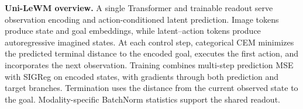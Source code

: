 \caption{\textbf{Uni-LeWM overview.} A single Transformer and trainable readout serve observation encoding and action-conditioned latent prediction. Image tokens produce state and goal embeddings, while latent--action tokens produce autoregressive imagined states. At each control step, categorical CEM minimizes the predicted terminal distance to the encoded goal, executes the first action, and incorporates the next observation. Training combines multi-step prediction MSE with SIGReg on encoded states, with gradients through both prediction and target branches. Termination uses the distance from the current observed state to the goal. Modality-specific BatchNorm statistics support the shared readout.}
\label{fig:uni-lewm-overview}
